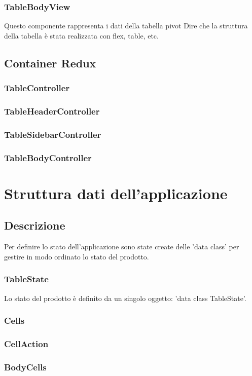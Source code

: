 \subsubsection{TableBodyView}
Questo componente rappresenta i dati della tabella pivot
Dire che la struttura della tabella è stata realizzata con flex, table, etc.

\subsection{Container Redux}
\subsubsection{TableController}
\subsubsection{TableHeaderController}
\subsubsection{TableSidebarController}
\subsubsection{TableBodyController}

\section{Struttura dati dell'applicazione}

\subsection{Descrizione}
Per definire lo stato dell'applicazione sono state create delle 'data class' per gestire in modo ordinato lo stato del prodotto.
\subsubsection{TableState}
Lo stato del prodotto è definito da un singolo oggetto: 'data class TableState'.
\subsubsection{Cells}
\subsubsection{CellAction}
\subsubsection{BodyCells}



